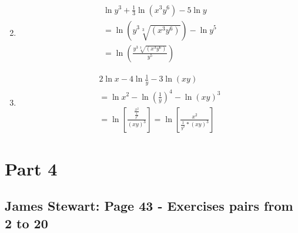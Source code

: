 \documentclass{article}
\begin{document}
\begin{enumerate}
\begin{align}
	      \end{align}
	\item
	      \begin{align}
		      \ln y^3+\frac{1}{3}\ln (x^3y^6)-5\ln y           \\
		      = \ln \left(y^3\sqrt[3]{(x^3y^6)}\right)-\ln y^5 \\
		      = \ln \left(\frac{y^3\sqrt[3]{(x^3y^6)}}{y^5}\right)
	      \end{align}
	\item
	      \begin{align}
		      2\ln x-4\ln \frac{1}{y}-3\ln (xy)                   \\
		      = \ln x^2-\ln \left(\frac{1}{y}\right)^4-\ln (xy)^3 \\
		      = \ln \left[\frac{\frac{x^2}{\frac{1}{y^4}}}{(xy)^3}\right]
		      = \ln \left[\frac{x^2}{\frac{1}{y^4}*(xy)^3}\right]
	      \end{align}
\end{enumerate}

\section{Part 4}
\subsection{James Stewart: Page 43 - Exercises pairs from 2 to 20}
\end{document}
